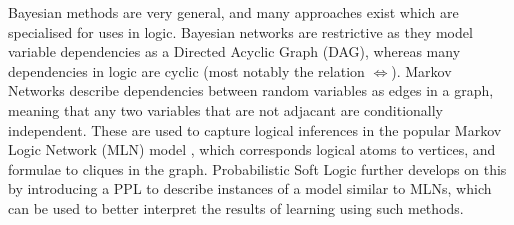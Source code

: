 Bayesian methods are very general, and many approaches exist which are specialised for uses in logic. Bayesian networks are restrictive as they model variable dependencies as a Directed Acyclic Graph (DAG), whereas many dependencies in logic are cyclic (most notably the relation $\iff$). Markov Networks describe dependencies between random variables as edges in a graph, meaning that any two variables that are not adjacant are conditionally independent. These are used to capture logical inferences in the popular Markov Logic Network (MLN) model \cite{markovlogicnetworks}, which corresponds logical atoms to vertices, and formulae to cliques in the graph. Probabilistic Soft Logic \cite{probsoftlogic} further develops on this by introducing a PPL to describe instances of a model similar to MLNs, which can be used to better interpret the results of learning using such methods.



